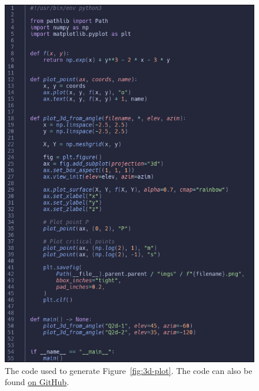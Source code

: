 \documentclass[a4paper]{article}
\begin{document}
\begin{figure}[h]
	\centering
	\includegraphics[scale=0.5]{Q2d-code}
	\caption{The code used to generate Figure~\ref{fig:3d-plot}. The code can also be found \href{https://github.com/DoctorDalek1963/uni}{on GitHub}.}
\end{figure}

\end{document}
